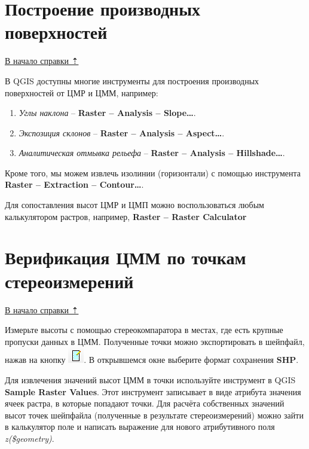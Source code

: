 \documentclass[
  12pt,
]{book}
\begin{document}
\hypertarget{dem-derived}{%
\section{Построение производных поверхностей}\label{dem-derived}}

\protect\hyperlink{dem}{В начало справки ⇡}

В QGIS доступны многие инструменты для построения производных поверхностей от ЦМР и ЦММ, например:

\begin{enumerate}
\def\labelenumi{\arabic{enumi})}
\item
  \emph{Углы наклона} -- \textbf{Raster -- Analysis -- Slope\ldots{}}.
\item
  \emph{Экспозиция склонов} -- \textbf{Raster -- Analysis -- Aspect\ldots{}}.
\item
  \emph{Аналитическая отмывка рельефа} -- \textbf{Raster -- Analysis -- Hillshade\ldots{}}.
\end{enumerate}

Кроме того, мы можем извлечь изолинии (горизонтали) с помощью инструмента \textbf{Raster -- Extraction -- Contour\ldots{}}.

Для сопоставления высот ЦМР и ЦМП можно воспользоваться любым калькулятором растров, например, \textbf{Raster -- Raster Calculator}

\hypertarget{dem-verification}{%
\section{Верификация ЦММ по точкам стереоизмерений}\label{dem-verification}}

\protect\hyperlink{dem}{В начало справки ⇡}

Измерьте высоты с помощью стереокомпаратора в местах, где есть крупные пропуски данных в ЦММ. Полученные точки можно экспортировать в шейпфайл, нажав на кнопку \includegraphics{images/Ref14/Export_survey_point.png}. В открывшемся окне выберите формат сохранения \textbf{SHP}.

Для извлечения значений высот ЦММ в точки используйте инструмент в QGIS \textbf{Sample Raster Values}. Этот инструмент записывает в виде атрибута значения ячеек растра, в которые попадают точки. Для расчёта собственных значений высот точек шейпфайла (полученные в результате стереоизмерений) можно зайти в калькулятор поле и написать выражение для нового атрибутивного поля \emph{z(\$geometry)}.
\end{document}
